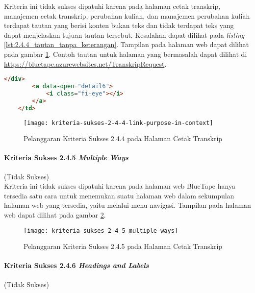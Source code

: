Kriteria ini tidak sukses dipatuhi karena pada halaman cetak transkrip, manajemen cetak transkrip, perubahan kuliah, dan manajemen perubahan kuliah terdapat tautan yang berisi konten bukan teks dan tidak terdapat teks yang dapat menjelaskan tujuan tautan tersebut. Kesalahan dapat dilihat pada \textit{listing} \ref{lst:2.4.4_tautan_tanpa_keterangan}. Tampilan pada halaman web dapat dilihat pada gambar \ref{fig:2.4.4_link_purpose_in_context}. Contoh tautan untuk halaman yang bermasalah dapat dilihat di \url{https://bluetape.azurewebsites.net/TranskripRequest}.

\begin{lstlisting}[frame=single, label={lst:2.4.4_tautan_tanpa_keterangan}, language=HTML, caption=Pelanggaran Kriteria Sukses 2.4.4 pada Halaman Cetak Transkrip]
        </div>
        <a data-open="detail6">
            <i class="fi-eye"></i>
        </a>
    </td>
\end{lstlisting}

\begin{figure}[H]
    \centering  
    \texttt{[image: kriteria-sukses-2-4-4-link-purpose-in-context]}  
    \caption[Pelanggaran Kriteria Sukses 2.4.4 pada Halaman Cetak Transkrip]{Pelanggaran Kriteria Sukses 2.4.4 pada Halaman Cetak Transkrip}
    \label{fig:2.4.4_link_purpose_in_context}  
\end{figure} 

\paragraph{Kriteria Sukses 2.4.5 \textit{Multiple Ways}}
\label{par:kepatuhan_bluetape_kriteria_sukses_2.4.5}
(Tidak Sukses)\\

Kriteria ini tidak sukses dipatuhi karena pada halaman web BlueTape hanya tersedia satu cara untuk menemukan suatu halaman web dalam sekumpulan halaman web yang tersedia, yaitu melalui menu navigasi. Tampilan pada halaman web dapat dilihat pada gambar \ref{fig:2.4.5_multiple_ways}.

\begin{figure}[H]
    \centering  
    \texttt{[image: kriteria-sukses-2-4-5-multiple-ways]}  
    \caption[Pelanggaran Kriteria Sukses 2.4.5 pada Halaman Cetak Transkrip]{Pelanggaran Kriteria Sukses 2.4.5 pada Halaman Cetak Transkrip}
    \label{fig:2.4.5_multiple_ways}  
\end{figure}

\paragraph{Kriteria Sukses 2.4.6 \textit{Headings and Labels}}
\label{par:kepatuhan_bluetape_kriteria_sukses_2.4.6}
(Tidak Sukses)\\

